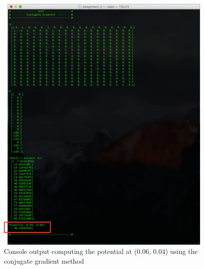 \documentclass[11pt]{amsart}
\begin{document}
\begin{figure}[h!]
   \includegraphics[width=0.95\textwidth]{assets/cg_potential}
   \caption{Console output computing the potential at (0.06, 0.04) using the conjugate gradient method}
   \label{fig:cg_potential}
\end{figure}
\pagebreak
\end{document}
